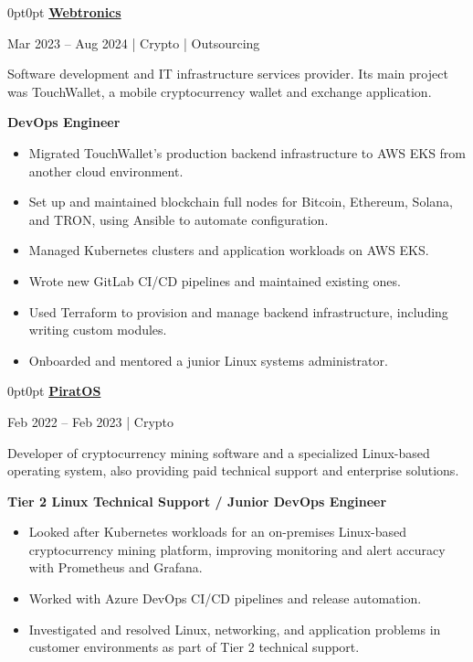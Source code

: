 \documentclass[12pt,letterpaper]{article}
\newenvironment{highlights}{%
  \begin{itemize}[
    topsep=.12cm,
    parsep=.08cm,
    itemsep=0pt,
    leftmargin=10pt
  ]}{%
  \end{itemize}}
\newenvironment{block}{%
  \begin{adjustwidth}{0pt}{0pt}}{%
  \end{adjustwidth}}
\newlength{\companydatesep}
\newlength{\datedescriptionsep}
\newlength{\descriptionrolesep}
\newcommand{\experienceheader}[5]{%
  \needspace{7\baselineskip}%
  \textbf{\href{#2}{#1 \faAlt{link}}}\par
  \vspace{\companydatesep}%
  #3\par
  \vspace{\datedescriptionsep}%
  #4\par
  \vspace{\descriptionrolesep}%
  \textbf{#5}\par
}
\newcommand{\tripledotsline}{%
  \par\vspace{0.16cm}%
  \noindent\makebox[\linewidth][c]{%
    \ldots
  }%
  \par\vspace{0.16cm}%
}
\begin{document}
\begin{block}
  \experienceheader
    {Webtronics}
    {https://webtronics.ru/}
    {Mar 2023 -- Aug 2024 | Crypto | Outsourcing}
    {Software development and IT infrastructure services
     provider. Its main project was TouchWallet, a mobile cryptocurrency wallet and exchange application.}
    {DevOps Engineer}

  \begin{highlights}
    \item Migrated TouchWallet's production backend infrastructure
    to AWS EKS from another cloud environment.

    \item Set up and maintained blockchain full nodes for
    Bitcoin, Ethereum, Solana, and TRON, using Ansible
    to automate configuration.

    \item Managed Kubernetes clusters and application
    workloads on AWS EKS.

    \item Wrote new GitLab CI/CD pipelines and maintained
    existing ones.

    \item Used Terraform to provision and manage backend
    infrastructure, including writing custom modules.

    \item Onboarded and mentored a junior Linux
    systems administrator.
  \end{highlights}
\end{block}

\tripledotsline

\begin{block}
  \experienceheader
    {PiratOS}
    {https://web.archive.org/web/20221005062315/https://piratos.cc/}
    {Feb 2022 -- Feb 2023 | Crypto}
    {Developer of cryptocurrency mining software and a
     specialized Linux-based operating system, also providing
     paid technical support and enterprise solutions.}
    {Tier 2 Linux Technical Support / Junior DevOps Engineer}

  \begin{highlights}
    \item Looked after Kubernetes workloads for an on-premises
    Linux-based cryptocurrency mining platform, improving
    monitoring and alert accuracy with Prometheus and Grafana.

    \item Worked with Azure DevOps CI/CD pipelines
    and release automation.

    \item Investigated and resolved Linux, networking,
    and application problems in customer environments
    as part of Tier 2 technical support.
  \end{highlights}
\end{block}
\end{document}
